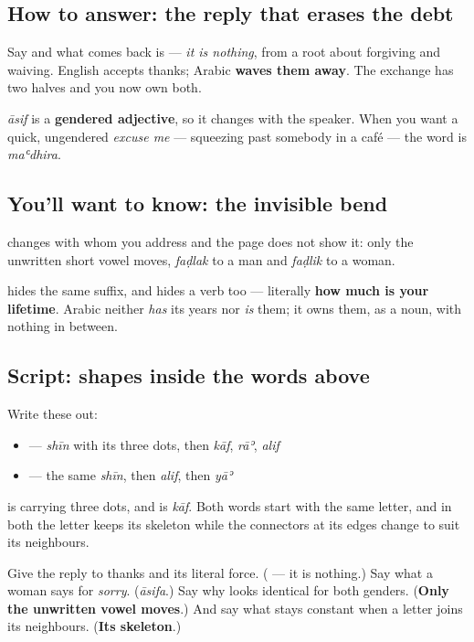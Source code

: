 \subsection*{How to answer: the reply that erases the debt}
Say \textbf{} and what comes back is \textbf{} — \emph{it is nothing}, from a root about forgiving and waiving. English accepts thanks; Arabic \textbf{waves them away}. The exchange has two halves and you now own both.

\emph{āsif} is a \textbf{gendered adjective}, so it changes with the speaker. When you want a quick, ungendered \emph{excuse me} — squeezing past somebody in a café — the word is \emph{maʿdhira}.

\subsection*{You'll want to know: the invisible bend}
\textbf{ } changes with whom you address and the page does not show it: only the unwritten short vowel moves, \emph{faḍlak} to a man and \emph{faḍlik} to a woman.

\textbf{ } hides the same suffix, and hides a verb too — literally \textbf{how much is your lifetime}. Arabic neither \emph{has} its years nor \emph{is} them; it owns them, as a noun, with nothing in between.

\subsection*{Script: shapes inside the words above}
Write these out:

\begin{itemize}
\raggedright
  \item \textbf{} — \emph{shīn} with its three dots, then \emph{kāf}, \emph{rāʾ}, \emph{alif}
  \item \textbf{} — the same \emph{shīn}, then \emph{alif}, then \emph{yāʾ}
\end{itemize}

\textbf{} is \textbf{} carrying three dots, and \textbf{} is \emph{kāf}. Both words start with the same letter, and in both the letter keeps its skeleton while the connectors at its edges change to suit its neighbours.

\begin{tcolorbox}[breakable,colback=teal!4,colframe=teal!35!black,title={Before you move on}]
Give the reply to thanks and its literal force. (\textbf{} — it is nothing.) Say what a woman says for \emph{sorry}. (\emph{āsifa}.) Say why \textbf{ } looks identical for both genders. (\textbf{Only the unwritten vowel moves}.) And say what stays constant when a letter joins its neighbours. (\textbf{Its skeleton}.)
\end{tcolorbox}
